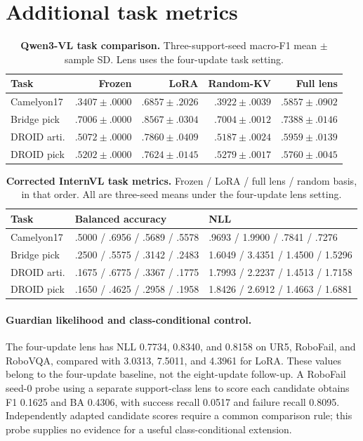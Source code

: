 \documentclass{article}
\begin{document}
\section{Additional task metrics}
\label{app:tasks}
\begin{table}[!ht]
\caption{\textbf{Qwen3-VL task comparison.} Three-support-seed macro-F1 mean $\pm$ sample SD. Lens uses the four-update task setting.}
\centering\small
\begin{tabular}{@{}lrrrr@{}}
\toprule
Task & Frozen & LoRA & Random-KV & Full lens\\
\midrule
Camelyon17 & $.3407\pm.0000$ & $\mathbf{.6857\pm.2026}$ & $.3922\pm.0039$ & $.5857\pm.0902$\\
Bridge pick & $.7006\pm.0000$ & $\mathbf{.8567\pm.0304}$ & $.7004\pm.0012$ & $.7388\pm.0146$\\
DROID arti. & $.5072\pm.0000$ & $\mathbf{.7860\pm.0409}$ & $.5187\pm.0024$ & $.5959\pm.0139$\\
DROID pick & $.5202\pm.0000$ & $\mathbf{.7624\pm.0145}$ & $.5279\pm.0017$ & $.5760\pm.0045$\\
\bottomrule
\end{tabular}
\end{table}

\begin{table}[!ht]
\caption{\textbf{Corrected InternVL task metrics.} Frozen / LoRA / full lens / random basis, in that order. All are three-seed means under the four-update lens setting.}
\centering\small
\begin{tabular}{@{}lll@{}}
\toprule
Task & Balanced accuracy & NLL\\
\midrule
Camelyon17 & .5000 / .6956 / .5689 / .5578 & .9693 / 1.9900 / .7841 / .7276\\
Bridge pick & .2500 / .5575 / .3142 / .2483 & 1.6049 / 3.4351 / 1.4500 / 1.5296\\
DROID arti. & .1675 / .6775 / .3367 / .1775 & 1.7993 / 2.2237 / 1.4513 / 1.7158\\
DROID pick & .1650 / .4625 / .2958 / .1958 & 1.8426 / 2.6912 / 1.4663 / 1.6881\\
\bottomrule
\end{tabular}
\end{table}

\paragraph{Guardian likelihood and class-conditional control.}
The four-update lens has NLL 0.7734, 0.8340, and 0.8158 on UR5, RoboFail, and RoboVQA, compared with 3.0313, 7.5011, and 4.3961 for LoRA. These values belong to the four-update baseline, not the eight-update follow-up. A RoboFail seed-0 probe using a separate support-class lens to score each candidate obtains F1 0.1625 and BA 0.4306, with success recall 0.0517 and failure recall 0.8095. Independently adapted candidate scores require a common comparison rule; this probe supplies no evidence for a useful class-conditional extension.
\end{document}
